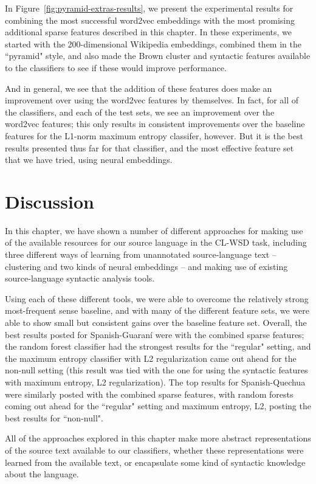 In Figure~\ref{fig:pyramid-extras-results}, we present the experimental results
for combining the most successful word2vec embeddings with the most promising
additional sparse features described in this chapter. In these experiments, we
started with the 200-dimensional Wikipedia embeddings, combined them in the
``pyramid" style, and also made the Brown cluster and syntactic features
available to the classifiers to see if these would improve performance.

And in general, we see that the addition of these features does make an
improvement over using the word2vec features by themselves. In fact, for all of
the classifiers, and each of the test sets, we see an improvement over the
word2vec features; this only results in consistent improvements over the
baseline features for the L1-norm maximum entropy classifer, however. But it is
the best results presented thus far for that classifier, and the most effective
feature set that we have tried, using neural embeddings.

\section{Discussion}
In this chapter, we have shown a number of different approaches for making use
of the available resources for our source language in the CL-WSD task,
including three different ways of learning from unannotated source-language
text -- clustering and two kinds of neural embeddings -- and making use of
existing source-language syntactic analysis tools.

Using each of these different tools, we were able to overcome the relatively
strong most-frequent sense baseline, and with many of the different feature
sets, we were able to show small but consistent gains over the baseline feature
set. Overall, the best results posted for Spanish-Guaraní were with the
combined sparse features; the random forest classifier had the strongest
results for the ``regular" setting, and the maximum entropy classifier with L2
regularization came out ahead for the non-null setting (this result was tied
with the one for using the syntactic features with maximum entropy, L2
regularization). The top results for Spanish-Quechua were similarly posted with
the combined sparse features, with random forests coming out ahead for the
``regular" setting and maximum entropy, L2, posting the best results for
``non-null".

All of the approaches explored in this chapter make more abstract
representations of the source text available to our classifiers, whether these
representations were learned from the available text, or encapsulate some kind
of syntactic knowledge about the language.

